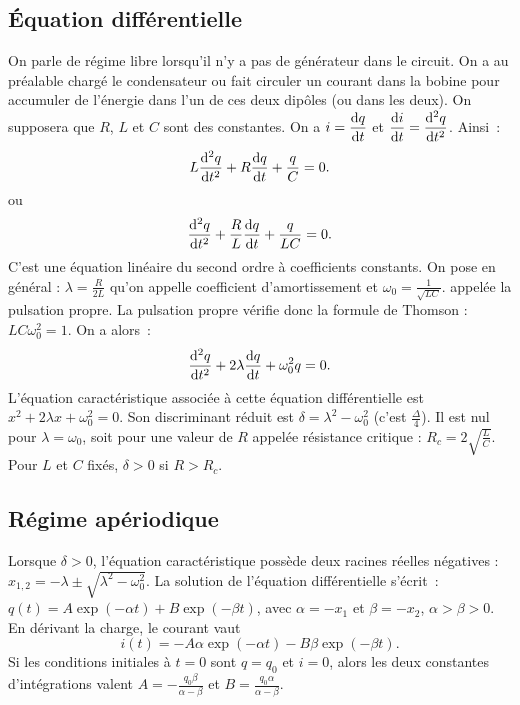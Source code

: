 \subsection{Équation différentielle}%
On parle de régime libre lorsqu’il n’y a pas de générateur dans le circuit. On 
a au préalable chargé le condensateur ou fait circuler un courant dans la 
bobine pour accumuler de l’énergie dans l’un de ces deux dipôles (ou dans les 
deux). On supposera que \(R\), \(L\) et \(C\) sont des constantes. On a \(i = 
\dfrac{\mathrm{d} q}{\mathrm{d} t}\) et \(\dfrac{\mathrm{d} i}{\mathrm{d} t} = \dfrac{\mathrm{d}^2 q}{\mathrm{d} {t}^2}\). Ainsi~:
\begin{equation}%
  L \deriveds{q}{t} + R \derived{q}{t} + \frac{q}{C} = 0.
\end{equation}%
ou
\begin{equation}%
  \deriveds{q}{t} + \frac{R}{L} \derived{q}{t} + \frac{q}{LC} = 0.
\end{equation}%
C'est une équation linéaire du second ordre à coefficients constants. On pose 
en général : \(\lambda = \frac{R}{2L}\) qu'on appelle coefficient 
d'amortissement et \(\omega_0 = \frac{1}{\sqrt{LC}}\). appelée la pulsation 
propre. La pulsation propre vérifie donc la formule de Thomson : \(L C 
\omega_0^2 = 1\). On a alors~:
\begin{equation}%
  \deriveds{q}{t} + 2\lambda \derived{q}{t} + \omega_0^2 q = 0.
\end{equation}%
L'équation caractéristique associée à cette équation différentielle est \(x^2 + 
2\lambda x + \omega_0^2=0\).  Son discriminant réduit est \(\delta = 
\lambda^2-\omega_0^2\) (c'est \(\frac{\Delta}{4}\)). Il est nul pour 
\(\lambda=\omega_0\), soit pour une valeur de \(R\) appelée résistance critique 
: \(R_c = 2\sqrt{\frac{L}{C}}\). Pour \(L\) et \(C\) fixés, \(\delta>0\) si \(R 
> R_c\).
\subsection{Régime apériodique}%
Lorsque \(\delta >0\), l'équation caractéristique possède deux racines réelles 
négatives : \(x_{1, 2} = -\lambda \pm \sqrt{\lambda^2 -\omega_0^2}\). La 
solution de l'équation différentielle s'écrit~: \(q(t) = A\exp(-\alpha t) + 
B\exp(-\beta t)\), avec \(\alpha = -x_1\) et \(\beta=-x_2\), 
\(\alpha>\beta>0\). En dérivant la charge, le courant vaut
\begin{equation}%
  i(t) = -A\alpha \exp{(-\alpha t)} - B\beta \exp{(-\beta t)}.
\end{equation}%
Si les conditions initiales à \(t=0\) sont \(q=q_0\) et \(i=0\), alors les deux 
constantes d'intégrations valent \(A = -\frac{q_0 \beta}{\alpha - \beta}\) et 
\(B = \frac{q_0 \alpha}{\alpha - \beta}\).

